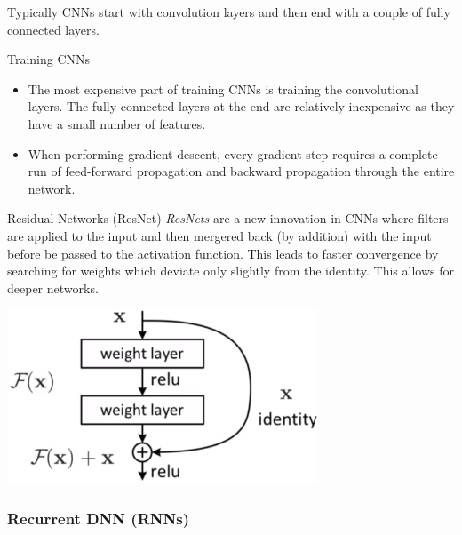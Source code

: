 \documentclass[11pt,a4paper]{article}
\begin{document}
    \begin{remark}{Typically CNNs start with convolution layers and then end with a couple of fully connected layers.}\end{remark}

    \begin{remark}{Training CNNs}
      \begin{itemize}
        \item The most expensive part of training CNNs is training the convolutional layers. The fully-connected layers at the end are relatively inexpensive as they have a small number of features.
        \item When performing gradient descent, every gradient step requires a complete run of feed-forward propagation and backward propagation through the entire network.
      \end{itemize}
    \end{remark}

    \begin{proposition}{Residual Networks (ResNet)}
      \textit{ResNets} are a new innovation in CNNs where filters are applied to the input and then mergered back (by addition) with the input before be passed to the activation function. This leads to faster convergence by searching for weights which deviate only slightly from the identity. This allows for deeper networks.
      \begin{center}
        \includegraphics[width=.35\textwidth]{ResNet.PNG}
      \end{center}
    \end{proposition}

\subsubsection{Recurrent DNN (RNNs)}
\end{document}

